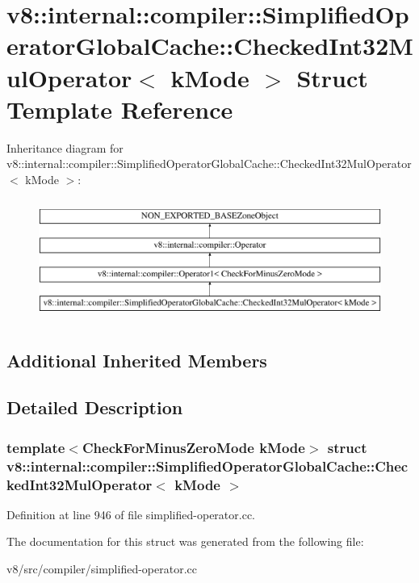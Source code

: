 \hypertarget{structv8_1_1internal_1_1compiler_1_1SimplifiedOperatorGlobalCache_1_1CheckedInt32MulOperator}{}\section{v8\+:\+:internal\+:\+:compiler\+:\+:Simplified\+Operator\+Global\+Cache\+:\+:Checked\+Int32\+Mul\+Operator$<$ k\+Mode $>$ Struct Template Reference}
\label{structv8_1_1internal_1_1compiler_1_1SimplifiedOperatorGlobalCache_1_1CheckedInt32MulOperator}
Inheritance diagram for v8\+:\+:internal\+:\+:compiler\+:\+:Simplified\+Operator\+Global\+Cache\+:\+:Checked\+Int32\+Mul\+Operator$<$ k\+Mode $>$\+:\begin{figure}[H]
\begin{center}
\leavevmode
\includegraphics[height=4.000000cm]{structv8_1_1internal_1_1compiler_1_1SimplifiedOperatorGlobalCache_1_1CheckedInt32MulOperator}
\end{center}
\end{figure}
\subsection*{Additional Inherited Members}


\subsection{Detailed Description}
\subsubsection*{template$<$Check\+For\+Minus\+Zero\+Mode k\+Mode$>$\newline
struct v8\+::internal\+::compiler\+::\+Simplified\+Operator\+Global\+Cache\+::\+Checked\+Int32\+Mul\+Operator$<$ k\+Mode $>$}



Definition at line 946 of file simplified-\/operator.\+cc.



The documentation for this struct was generated from the following file\+:\begin{DoxyCompactItemize}
\item 
v8/src/compiler/simplified-\/operator.\+cc\end{DoxyCompactItemize}

